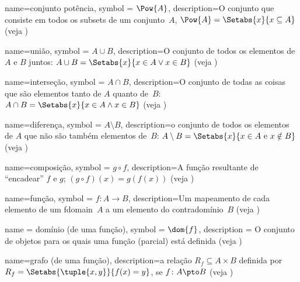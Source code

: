  {
  name={conjunto potência},
  symbol = {\ensuremath{\Pow{A}}},  
  description={O conjunto que consiste em todos os \glspl{subset} de um conjunto~$A$,
    $\Pow{A} = \Setabs{x}{x \subseteq A}$ (veja
    )} }

 {
  name=união,
  symbol = {\ensuremath{A \cup B}},
  description={O conjunto de todos os {elementos} de $A$ e $B$ juntos: $A
    \cup B = \Setabs{x}{x \in A \lor x\in B}$ (veja
    )} }

 {
  name=interseção,
  symbol = {\ensuremath{A \cap B}},
  description={O conjunto de todas as coisas que são {elementos} tanto de
    $A$ quanto de~$B$: $A \cap B = \Setabs{x}{x \in A \land x\in B}$ (veja
    )} }

 {
  name=diferença,
  symbol = {\ensuremath{A \setminus B}},
  description={o conjunto de todos os {elementos} de $A$ que não são também
  {elementos} de~$B$: $A \setminus B = \Setabs{x}{x \in A \text{ e }
    x \notin B}$ (veja )} }


 {
  name=composição,
  symbol = {\ensuremath{g \circ f}},  
  description={A função resultante de ``encadear'' $f$
    e $g$; $(g \circ f)(x) = g(f(x))$ (veja
    )} }

 {
  name=função,
  symbol = {\ensuremath{f \colon A \to B}},
  description={Um mapeamento de cada elemento de um \gls{fdomain}~$A$ a um
    elemento do contradomínio~$B$ (veja )} }

 {
  name = {domínio (de uma função)},
  symbol = {\ensuremath{\dom{f}}},
  description = {O conjunto de objetos para os quais uma função (parcial) está
    definida (veja )}}


 {
  name=grafo (de uma função),
  description={a relação $R_f \subseteq A \times B$ definida por $R_f
    = \Setabs{\tuple{x,y}}{f(x) = y}$, se $f\colon A \pto B$ (veja
    )} }

